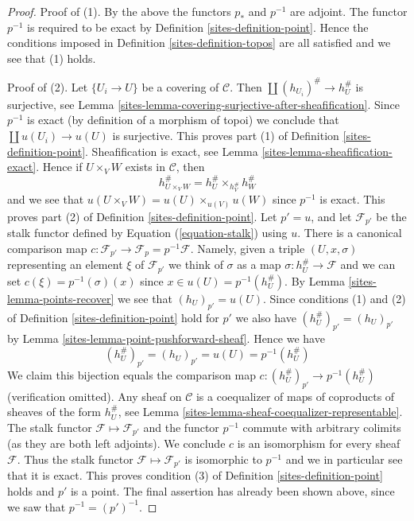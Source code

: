 \begin{proof}

Proof of (1). By the above the functors $p_*$ and $p^{-1}$ are adjoint.
The functor $p^{-1}$ is required to be exact by
Definition \ref{sites-definition-point}.
Hence the conditions imposed in
Definition \ref{sites-definition-topos}
are all satisfied and we see that (1) holds.

\medskip\noindent
Proof of (2). Let $\{U_i \to U\}$ be a covering of $\mathcal{C}$.
Then $\coprod (h_{U_i})^\# \to h_U^\#$ is surjective, see
Lemma \ref{sites-lemma-covering-surjective-after-sheafification}.
Since $p^{-1}$ is exact (by definition of a morphism of topoi) we conclude
that $\coprod u(U_i) \to u(U)$ is surjective.
This proves part (1) of
Definition \ref{sites-definition-point}.
Sheafification is exact, see
Lemma \ref{sites-lemma-sheafification-exact}.
Hence if $U \times_V W$ exists in $\mathcal{C}$, then
$$
h_{U \times_V W}^\# =  h_U^\# \times_{h_V^\#} h_W^\#
$$
and we see that $u(U \times_V W) = u(U) \times_{u(V)} u(W)$ since $p^{-1}$
is exact. This proves part (2) of
Definition \ref{sites-definition-point}.
Let $p' = u$, and let $\mathcal{F}_{p'}$ be the stalk functor
defined by Equation (\ref{equation-stalk}) using $u$. There is
a canonical comparison map
$c : \mathcal{F}_{p'} \to \mathcal{F}_p = p^{-1}\mathcal{F}$.
Namely, given a triple $(U, x, \sigma)$ representing an element $\xi$
of $\mathcal{F}_{p'}$ we think of $\sigma$ as a map
$\sigma : h_U^\# \to \mathcal{F}$ and we can set
$c(\xi) = p^{-1}(\sigma)(x)$ since $x \in u(U) = p^{-1}(h_U^\#)$. By
Lemma \ref{sites-lemma-points-recover}
we see that $(h_U)_{p'} = u(U)$. Since conditions (1) and (2) of
Definition \ref{sites-definition-point}
hold for $p'$ we also have $(h_U^\#)_{p'} = (h_U)_{p'}$ by
Lemma \ref{sites-lemma-point-pushforward-sheaf}.
Hence we have
$$
(h_U^\#)_{p'} = (h_U)_{p'} = u(U) = p^{-1}(h_U^\#)
$$
We claim this bijection equals the comparison map
$c : (h_U^\#)_{p'} \to p^{-1}(h_U^\#)$ (verification omitted).
Any sheaf on $\mathcal{C}$ is a coequalizer of maps
of coproducts of sheaves of the form $h_U^\#$, see
Lemma \ref{sites-lemma-sheaf-coequalizer-representable}.
The stalk functor $\mathcal{F} \mapsto \mathcal{F}_{p'}$ and
the functor $p^{-1}$ commute with arbitrary colimits (as they
are both left adjoints).
We conclude $c$ is an isomorphism for every sheaf $\mathcal{F}$.
Thus the stalk functor $\mathcal{F} \mapsto \mathcal{F}_{p'}$
is isomorphic to $p^{-1}$ and we in particular see that it is exact.
This proves condition (3) of
Definition \ref{sites-definition-point}
holds and $p'$ is a point. The final assertion has already been shown
above, since we saw that $p^{-1} = (p')^{-1}$.
\end{proof}

